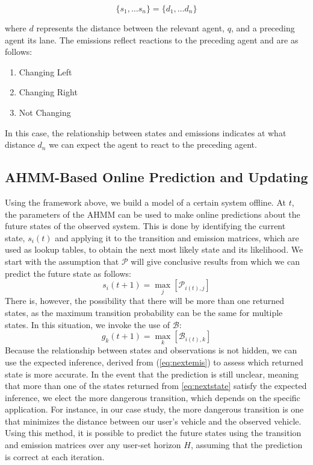 \documentclass[conference]{IEEEtran}
\newcommand\NB[1]{$\spadesuit$\footnote{NB: #1}}
\begin{document}
\begin{equation}
\{s_1,\ldots s_n\} = \{d_1,\ldots d_n\}
\end{equation}

where $d$ represents the distance between the relevant agent, $q$, and a preceding agent its lane. The emissions reflect reactions to the preceding agent and are as follows:
\begin{enumerate}
    \item Changing Left
    \item Changing Right
    \item Not Changing
\end{enumerate}
In this case, the relationship between states and emissions indicates at what distance $d_n$ we can expect the agent to react to the preceding agent.

\subsection{AHMM-Based Online Prediction and Updating} \label{sec:ahmmpredupdate} %
 Using the framework above, we build a model of a certain system offline. At $t$, the parameters of the AHMM can be used to make online predictions about the future states of the observed system. This is done by identifying the current state, $s_{i}(t)$ and applying it to the transition and emission matrices, which are used as lookup tables, to obtain the next most likely state and its likelihood. We start with the assumption that $\mathcal{P}$ will give conclusive results from which we can predict the future state as follows:
\begin{equation} \label{eq:nextstate}
    s_{i}(t+1) = \max_{j}[\mathcal{P}_{i(t),j}]
\end{equation}
There is, however, the possibility that there will be more than one returned states, as the maximum transition probability can be the same for multiple states. In this situation, we invoke the use of $\mathcal{B}$:
\begin{equation} \label{eq:nextemis}
    g_{k}(t+1) = \max_{k}[\mathcal{B}_{i(t),k}]
\end{equation}
Because the relationship between states and observations is not hidden, we can use the expected inference, derived from (\ref{eq:nextemis}) to assess which returned state is more accurate. In the event that the prediction is still unclear, meaning that more than one of the states returned from \ref{eq:nextstate} satisfy the expected inference, we elect the more dangerous transition, which depends on the specific application. For instance, in our case study, the more dangerous transition is one that minimizes the distance between our user's vehicle and the observed vehicle. Using this method, it is possible to predict the future states using the transition and emission matrices over any user-set horizon $H$, assuming that the prediction is correct at each iteration. %
\end{document}
